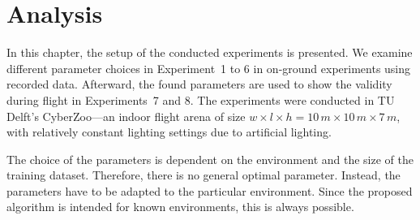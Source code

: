 \chapter{Analysis}
\label{chap:analysis}

In this chapter, the setup of the conducted experiments is
presented. We examine different parameter choices in Experiment~1 to 6
in on-ground experiments using recorded data. Afterward, the found
parameters are used to show the validity during flight in
Experiments~7 and 8. The experiments were conducted in TU Delft's
CyberZoo---an indoor flight arena of size $w \times l \times h = 10\,m
\times10\,m \times 7\,m$, with relatively constant lighting settings
due to artificial lighting.

The choice of the parameters is dependent on the environment and the size of the training dataset. Therefore, there is no general optimal parameter. Instead, the parameters have to be adapted to the particular environment. Since the proposed algorithm is intended for known environments, this is always possible.